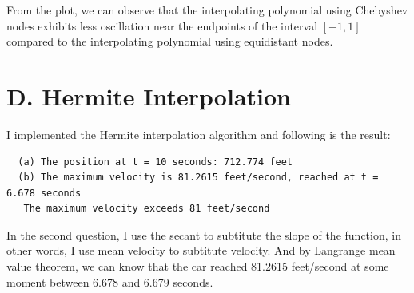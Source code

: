 \documentclass[a4paper]{article}
\begin{document}
From the plot, we can observe that the interpolating polynomial using Chebyshev nodes exhibits less oscillation near the endpoints of the interval \([-1, 1]\) compared to the interpolating polynomial using equidistant nodes.

\section{D. Hermite Interpolation}
I implemented the Hermite interpolation algorithm and following is the result:
\begin{lstlisting}
  (a) The position at t = 10 seconds: 712.774 feet
  (b) The maximum velocity is 81.2615 feet/second, reached at t = 6.678 seconds
   The maximum velocity exceeds 81 feet/second
\end{lstlisting}
In the second question, I use the secant to subtitute the slope of the function, in other words, I use mean velocity to subtitute velocity. And by Langrange mean value theorem, we can know that the car reached 81.2615 feet/second at some moment between 6.678 and 6.679 seconds.
\end{document}
